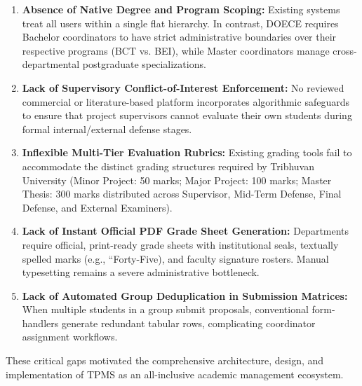 \begin{enumerate}[label=\textbf{G\arabic*.}]
    \item \textbf{Absence of Native Degree and Program Scoping:} Existing systems treat all users within a single flat hierarchy. In contrast, DOECE requires Bachelor coordinators to have strict administrative boundaries over their respective programs (BCT vs. BEI), while Master coordinators manage cross-departmental postgraduate specializations.
    
    \item \textbf{Lack of Supervisory Conflict-of-Interest Enforcement:} No reviewed commercial or literature-based platform incorporates algorithmic safeguards to ensure that project supervisors cannot evaluate their own students during formal internal/external defense stages.
    
    \item \textbf{Inflexible Multi-Tier Evaluation Rubrics:} Existing grading tools fail to accommodate the distinct grading structures required by Tribhuvan University (Minor Project: 50 marks; Major Project: 100 marks; Master Thesis: 300 marks distributed across Supervisor, Mid-Term Defense, Final Defense, and External Examiners).
    
    \item \textbf{Lack of Instant Official PDF Grade Sheet Generation:} Departments require official, print-ready grade sheets with institutional seals, textually spelled marks (e.g., ``Forty-Five), and faculty signature rosters. Manual typesetting remains a severe administrative bottleneck.
    
    \item \textbf{Lack of Automated Group Deduplication in Submission Matrices:} When multiple students in a group submit proposals, conventional form-handlers generate redundant tabular rows, complicating coordinator assignment workflows.
\end{enumerate}

These critical gaps motivated the comprehensive architecture, design, and implementation of TPMS as an all-inclusive academic management ecosystem.
